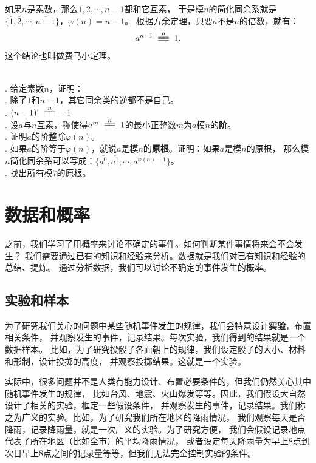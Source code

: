 \documentclass[12pt,UTF8,fontset=none]{ctexbook}
\begin{document}
如果$n$是素数，那么$1,2, \cdots , n-1$都和它互素，
于是模$n$的简化同余系就是$\{\overline{1},\overline{2}, \cdots , \overline{n-1}\}$，$\varphi(n) = n-1$。
根据方余定理，只要$a$不是$n$的倍数，就有：
$$ a^{n-1} \tong{n} 1 .$$
这个结论也叫做费马小定理。

\begin{xt}\label{xt:3-3-0}
    \mbox{}\\
    . 给定素数$n$，证明：\\
    . 除了$\overline{1}$和$\overline{n-1}$，其它同余类的逆都不是自己。\\
    . $(n-1)! \tong{n} -1.$ \\
    . 设$a$与$n$互素，称使得$a^m \tong{n} 1$的最小正整数$m$为$a$模$n$的\textbf{阶}。\\
    . 证明$a$的阶整除$\varphi(n)$。\\
    . 如果$a$的阶等于$\varphi(n)$，就说$a$是模$n$的\textbf{原根}。证明：如果$a$是模$n$的原根，
    那么模$n$简化同余系可以写成：$\{\overline{a^0}, \overline{a^1}, \cdots , \overline{a^{\varphi(n)-1}}\}$。\\
    . 找出所有模$7$的原根。
\end{xt}

\chapter{数据和概率}
之前，我们学习了用概率来讨论不确定的事件。如何判断某件事情将来会不会发生？
我们需要通过已有的知识和经验来分析。数据就是我们对已有知识和经验的总结、提炼。
通过分析数据，我们可以讨论不确定的事件发生的概率。

\section{实验和样本}
为了研究我们关心的问题中某些随机事件发生的规律，我们会特意设计\textbf{实验}，布置相关条件，
并观察发生的事件，记录结果。每次实验，我们得到的结果就是一个数据样本。
比如，为了研究投骰子各面朝上的规律，我们设定骰子的大小、材料和形制，设计投掷的高度，
并观察投掷结果。这就是一个实验。

实际中，很多问题并不是人类有能力设计、布置必要条件的，但我们仍然关心其中随机事件发生的规律，
比如台风、地震、火山爆发等等。因此，我们假设大自然设计了相关的实验，框定一些假设条件，
并观察发生的事件，记录结果。我们称之为广义的实验。比如，为了研究我们所在地区的降雨情况，
我们观察每天是否降雨，记录降雨量，就是一次广义的实验。为了研究方便，
我们会假设记录地点代表了所在地区（比如全市）的平均降雨情况，
或者设定每天降雨量为早上$8$点到次日早上$8$点之间的记录量等等，但我们无法完全控制实验的条件。
\end{document}
